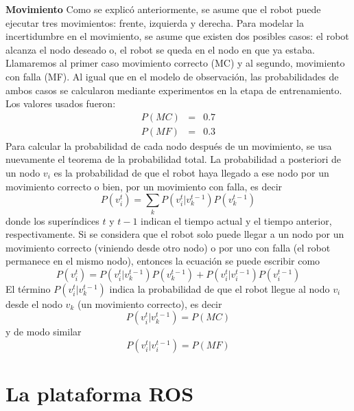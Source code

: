 \documentclass[a4paper]{article}
\begin{document}
\textbf{Movimiento}
Como se explicó anteriormente, se asume que el robot puede ejecutar tres movimientos: frente, izquierda y derecha. Para modelar la incertidumbre en el movimiento, se asume que existen dos posibles casos: el robot alcanza el nodo deseado o, el robot se queda en el nodo en que ya estaba. Llamaremos al primer caso movimiento correcto (MC) y al segundo, movimiento con falla (MF). Al igual que en el modelo de observación, las probabilidades de ambos casos se calcularon mediante experimentos en la etapa de entrenamiento. Los valores usados fueron:
\begin{eqnarray}
P(MC) &=& 0.7\\
P(MF) &=& 0.3
\end{eqnarray}
Para calcular la probabilidad de cada nodo después de un movimiento, se usa nuevamente el teorema de la probabilidad total. La probabilidad a posteriori de un nodo $v_i$ es la probabilidad de que el robot haya llegado a ese nodo por un movimiento correcto o bien, por un movimiento con falla, es decir
\begin{equation}
P\left(v_i^t\right) = \sum_k P\left(v_i^t|v_k^{t-1}\right) P\left(v_k^{t-1}\right)
\end{equation}
donde los superíndices $t$ y $t-1$ indican el tiempo actual y el tiempo anterior, respectivamente. Si se considera que el robot solo puede llegar a un nodo por un movimiento correcto (viniendo desde otro nodo) o por uno con falla (el robot permanece en el mismo nodo), entonces la ecuación se puede escribir como
\begin{equation}
P\left(v_i^t\right) = P\left(v_i^t|v_k^{t-1}\right)P\left(v_k^{t-1}\right) + P\left(v_i^t|v_i^{t-1}\right)P\left(v_i^{t-1}\right)
\end{equation}
El término $P\left(v_i^t|v_k^{t-1}\right)$ indica la probabilidad de que el robot llegue al nodo $v_i$ desde el nodo $v_k$ (un movimiento correcto), es decir
\begin{equation}
P\left(v_i^t|v_k^{t-1}\right) = P(MC)
\end{equation}
y de modo similar
\begin{equation}
P\left(v_i^t|v_i^{t-1}\right) = P(MF)
\end{equation}


\section{La plataforma ROS}


\end{document}
